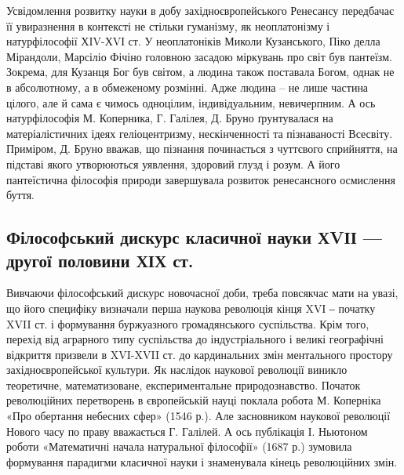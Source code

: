 Усвідомлення розвитку науки в добу західноєвропейського Ренесансу
передбачає її увиразнення в контексті не стільки гуманізму, як неоплатонізму і
натурфілософії ХIV-ХVІ ст. У неоплатоніків Миколи Кузанського, Піко делла
Мірандоли, Марсіліо Фічіно головною засадою міркувань про світ був
пантеїзм. Зокрема, для Кузанця Бог був світом, а людина також поставала
Богом, однак не в абсолютному, а в обмеженому розмінні. Адже людина – не
лише частина цілого, але й сама є чимось одноцілим, індивідуальним,
невичерпним. А ось натурфілософія М. Коперника, Г. Галілея, Д. Бруно
ґрунтувалася на матеріалістичних ідеях геліоцентризму, нескінченності та
пізнаваності Всесвіту. Приміром, Д. Бруно вважав, що пізнання починається з
чуттєвого сприйняття, на підставі якого утворюються уявлення, здоровий глузд
і розум. А його пантеїстична філософія природи завершувала розвиток
ренесансного осмислення буття.

\subsection[Філософський дискурс науки ХVІІ --- ХІХ ст.]{Філософський дискурс класичної науки ХVІІ --- другої половини ХІХ ст.} 
Вивчаючи філософський дискурс новочасної доби, треба повсякчас мати на
увазі, що його специфіку визначали перша наукова революція кінця XVІ ‒
початку XVII ст. і формування буржуазного громадянського суспільства. Крім
того, перехід від аграрного типу суспільства до індустріального і великі
географічні відкриття призвели в XVI-XVII ст. до кардинальних змін
ментального простору західноєвропейської культури. Як наслідок наукової
революції виникло теоретичне, математизоване, експериментальне
природознавство. Початок революційних перетворень в європейській науці
поклала робота М. Коперніка «Про обертання небесних сфер» (1546 р.). Але
засновником наукової революції Нового часу по праву вважається Г. Галілей. А
ось публікація І. Ньютоном роботи «Математичні начала натуральної
філософії» (1687 р.) зумовила формування парадигми класичної науки і
знаменувала кінець революційних змін.

